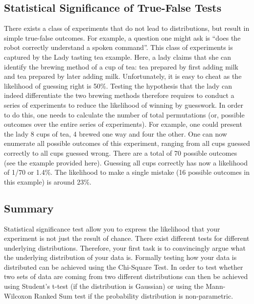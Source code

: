 \subsection{Statistical Significance of True-False Tests}
There exists a class of experiments that do not lead to distributions, but result in simple true-false outcomes. For example, a question one might ask is ``does the robot correctly understand a spoken command''. This class of experiments is captured by the Lady tasting tea example. Here, a lady claims that she can identify the brewing method of a cup of tea: tea prepared by first adding milk and tea prepared by later adding milk. Unfortunately, it is easy to cheat as the likelihood of guessing right is 50\%. Testing the hypothesis that the lady can indeed differentiate the two brewing methods therefore requires to conduct a series of experiments to reduce the likelihood of winning by guesswork. In order to do this, one needs to calculate the number of total permutations (or, possible outcomes over the entire series of experiments). For example, one could present the lady 8 cups of tea, 4 brewed one way and four the other. One can now enumerate all possible outcomes of this experiment, ranging from all cups guessed correctly to all cups guessed wrong. There are a total of 70 possible outcomes (see the example provided here). Guessing all cups correctly has now a likelihood of 1/70 or 1.4\%. The likelihood to make a single mistake (16 possible outcomes in this example) is around 23\%.

\subsection{Summary}
Statistical significance test allow you to express the likelihood that your experiment is not just the result of chance. There exist different tests for different underlying distributions. Therefore, your first task is to convincingly argue what the underlying distribution of your data is. Formally testing how your data is distributed can be achieved using the Chi-Square Test. In order to test whether two sets of data are coming from two different distributions can then be achieved using Student's t-test (if the distribution is Gaussian) or using the Mann-Wilcoxon Ranked Sum test if the probability distribution is non-parametric.
